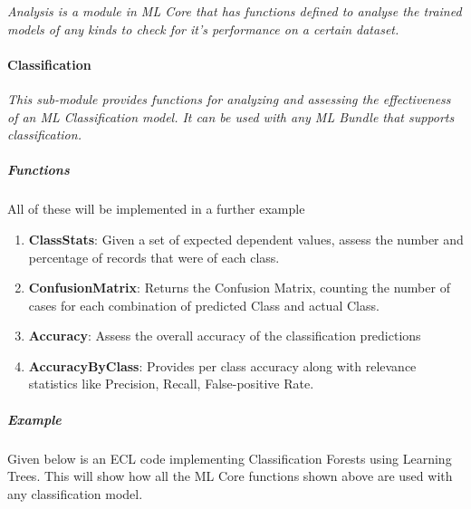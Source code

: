 \textit{Analysis is a module in ML Core that has functions defined to analyse the trained models of any kinds to check for it's performance on a certain dataset. }

\paragraph{Classification}\label{analysis:classification}

\textit{This sub-module provides functions for analyzing and assessing the effectiveness of an ML Classification model. It can be used with any ML Bundle that supports classification.}

\subparagraph{Functions}

All of these will be implemented in a further example

\begin{enumerate}
    \item \textbf{ClassStats}: Given a set of expected dependent values, assess the number and percentage of records that were of each class.
    \item \textbf{ConfusionMatrix}: Returns the Confusion Matrix, counting the number of cases for each combination of predicted Class and actual Class.
    \item \textbf{Accuracy}: Assess the overall accuracy of the classification predictions
    \item \textbf{AccuracyByClass}: Provides per class accuracy along with relevance statistics like Precision, Recall, False-positive Rate.
\end{enumerate}

\subparagraph{Example}\label{classification:example}

Given below is an ECL code implementing Classification Forests using Learning Trees. This will show how all the ML Core functions shown above are used with any classification model.

